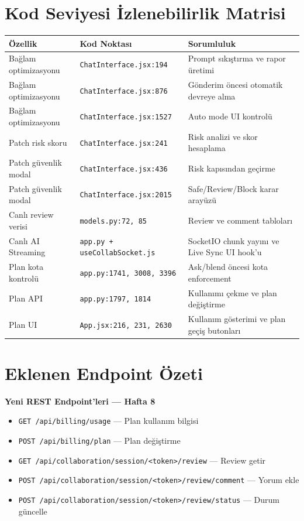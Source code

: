 \documentclass[11pt,a4paper]{article}
\begin{document}
\section{Kod Seviyesi İzlenebilirlik Matrisi}

\begin{tabularx}{\textwidth}{@{} L{3.5cm} L{4cm} X @{}}
\toprule
\textbf{Özellik} & \textbf{Kod Noktası} & \textbf{Sorumluluk} \\
\midrule
Bağlam optimizasyonu & \texttt{ChatInterface.jsx:194} & Prompt sıkıştırma ve rapor üretimi \\
Bağlam optimizasyonu & \texttt{ChatInterface.jsx:876} & Gönderim öncesi otomatik devreye alma \\
Bağlam optimizasyonu & \texttt{ChatInterface.jsx:1527} & Auto mode UI kontrolü \\
\addlinespace
Patch risk skoru & \texttt{ChatInterface.jsx:241} & Risk analizi ve skor hesaplama \\
Patch güvenlik modal & \texttt{ChatInterface.jsx:436} & Risk kapısından geçirme \\
Patch güvenlik modal & \texttt{ChatInterface.jsx:2015} & Safe/Review/Block karar arayüzü \\
\addlinespace
Canlı review verisi & \texttt{models.py:72, 85} & Review ve comment tabloları \\
Canlı AI Streaming & \texttt{app.py + useCollabSocket.js} & SocketIO chunk yayını ve Live Sync UI hook'u \\
\addlinespace
Plan kota kontrolü & \texttt{app.py:1741, 3008, 3396} & Ask/blend öncesi kota enforcement \\
Plan API & \texttt{app.py:1797, 1814} & Kullanımı çekme ve plan değiştirme \\
Plan UI & \texttt{App.jsx:216, 231, 2630} & Kullanım gösterimi ve plan geçiş butonları \\
\bottomrule
\end{tabularx}

\section{Eklenen Endpoint Özeti}

\textbf{Yeni REST Endpoint'leri — Hafta 8}

\begin{itemize}[leftmargin=1.5em]
  \item \texttt{GET /api/billing/usage} — Plan kullanım bilgisi
  \item \texttt{POST /api/billing/plan} — Plan değiştirme
  \item \texttt{GET /api/collaboration/session/<token>/review} — Review getir
  \item \texttt{POST /api/collaboration/session/<token>/review/comment} — Yorum ekle
  \item \texttt{POST /api/collaboration/session/<token>/review/status} — Durum güncelle
\end{itemize}
\end{document}
